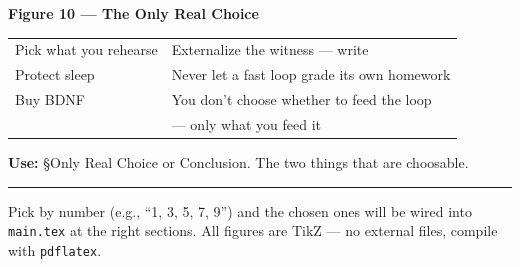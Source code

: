 \documentclass[11pt]{article}
\begin{document}
\vspace{14pt}
\begin{center}
\textbf{Figure 10 — The Only Real Choice}
\end{center}
\begin{center}
\begin{center}
\scriptsize
\begin{tabular}{p{5.8cm}p{5.8cm}}
\toprule
Pick what you rehearse & Externalize the witness — write \\
Protect sleep & Never let a fast loop grade its own homework \\
Buy BDNF & You don't choose whether to feed the loop \\
& \quad — only what you feed it \\
\bottomrule
\end{tabular}
\end{center}
\end{center}
{\scriptsize \textbf{Use:} \S Only Real Choice or Conclusion. The two things that are choosable.}

\vspace{8pt}
\hrule
\vspace{6pt}
\begin{center}
{\small Pick by number (e.g., ``1, 3, 5, 7, 9'') and the chosen ones will be wired into \texttt{main.tex} at the right sections. All figures are TikZ — no external files, compile with \texttt{pdflatex}.}
\end{center}
\end{document}
